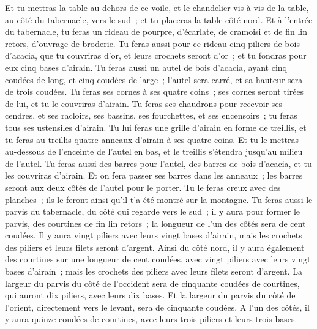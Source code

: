 \begin{multicols}{2}
Et tu mettras la table au dehors de ce voile, et le chandelier vis-à-vis de la table, au côté du tabernacle, vers le sud~; et tu placeras la table côté nord.
Et à l'entrée du tabernacle, tu feras un rideau de pourpre, d'écarlate, de cramoisi et de fin lin retors, d'ouvrage de broderie.
Tu feras aussi pour ce rideau cinq piliers de bois d'acacia, que tu couvriras d'or, et leurs crochets seront d'or~; et tu fondras pour eux cinq bases d'airain.
\VerseOne{}Tu feras aussi un autel de bois d'acacia, ayant cinq coudées de long, et cinq coudées de large~; l'autel sera carré, et sa hauteur sera de trois coudées.
Tu feras ses cornes à ses quatre coins~; ses cornes seront tirées de lui, et tu le couvriras d'airain.
Tu feras ses chaudrons pour recevoir ses cendres, et ses racloirs, ses bassins, ses fourchettes, et ses encensoirs~; tu feras tous ses ustensiles d'airain.
Tu lui feras une grille d'airain en forme de treillis, et tu feras au treillis quatre anneaux d'airain à ses quatre coins.
Et tu le mettras au-dessous de l'enceinte de l'autel en bas, et le treillis s'étendra jusqu'au milieu de l'autel.
Tu feras aussi des barres pour l'autel, des barres de bois d'acacia, et tu les couvriras d'airain.
Et on fera passer ses barres dans les anneaux~; les barres seront aux deux côtés de l'autel pour le porter.
Tu le feras creux avec des planches~; ils le feront ainsi qu'il t'a été montré sur la montagne.
Tu feras aussi le parvis du tabernacle, du côté qui regarde vers le sud~; il y aura pour former le parvis, des courtines de fin lin retors~; la longueur de l'un des côtés sera de cent coudées.
Il y aura vingt piliers avec leurs vingt bases d'airain, mais les crochets des piliers et leurs filets seront d'argent.
Ainsi du côté nord, il y aura également des courtines sur une longueur de cent coudées, avec vingt piliers avec leurs vingt bases d'airain~; mais les crochets des piliers avec leurs filets seront d'argent.
La largeur du parvis du côté de l'occident sera de cinquante coudées de courtines, qui auront dix piliers, avec leurs dix bases.
Et la largeur du parvis du côté de l'orient, directement vers le levant, sera de cinquante coudées.
A l'un des côtés, il y aura quinze coudées de courtines, avec leurs trois piliers et leurs trois bases.

\end{multicols}
